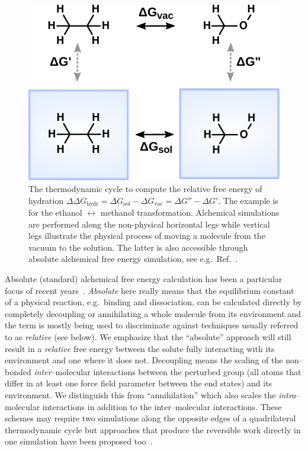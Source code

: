 \documentclass[journal=jctcce,manuscript=article]{achemso}
\begin{document}
\begin{figure}[ht]
  \includegraphics[scale=1.0]{figures/thermocycle.pdf}
  \caption{The thermodynamic cycle to compute the relative free energy
    of hydration
    $\Delta\Delta G_{\mathrm{hydr}}=\Delta G_{\mathrm{sol}}-\Delta
    G_{\mathrm{vac}}=\Delta G'' - \Delta G'$.  The example is for the
    ethanol $\leftrightarrow$ methanol transformation.  Alchemical
    simulations are performed along the non-physical horizontal
    legs while vertical legs illustrate the physical process of moving a 
    molecule from the vacuum to the solution.  The latter is also accessible 
    through absolute alchemical free energy simulation, see e.g.\ 
    Ref.~.}
  \label{fig:thermocycle}
\end{figure}

Absolute (standard) alchemical free energy calculation has been a
particular focus of recent years~\cite{GILSON19971047,
  doi:10.1021/jp0217839, deng_computations_2009,
  ytreberg_comparison_2006, doi:10.1021/ct500964e}.  \emph{Absolute}
here really means that the equilibrium constant of a physical
reaction, e.g.\ binding and dissociation, can be calculated directly
by completely decoupling or annihilating a whole molecule from its environment 
and the term is mostly being used to discriminate against techniques usually 
referred to as \emph{relative} (see below).  We emphasize that the 
``absolute'' approach will still result in a \emph{relative} free energy 
between the solute fully interacting with its environment and one where it does 
not.
Decoupling means the scaling of the non--bonded 
\emph{inter}--molecular interactions between the perturbed group (all atoms 
that differ in at least one force field parameter between the end states) and 
its environment.  We distinguish this from ``annihilation'' which also
scales the \emph{intra}--molecular interactions in addition to the 
inter--molecular interactions. These schemes may require two 
simulations along the opposite edges of a quadrilateral thermodynamic cycle 
but approaches that produce the reversible work directly in one simulation
have been proposed too~\cite{doi:10.1063/1.3519057, C3FD00125C}.
\end{document}
